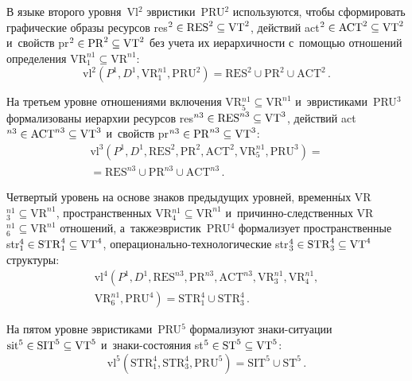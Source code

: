 \begin{multicols}{2}
  В языке второго уровня~Vl$^2$ эвристики~PRU$^2$ используются, чтобы 
сформировать графические образы ресурсов res$^2\hm\in \mathrm{RES}^2\subseteq 
\mathrm{VT}^2$, действий act$^2\hm\in \mathrm{ACT}^2\subseteq \mathrm{VT}^2$ 
и~свойств pr$^2\hm\in 
\mathrm{PR}^2\subseteq \mathrm{VT}^2$ без учета их иерархичности с~помощью отношений 
определения $\mathrm{VR}_1^{n1}\subseteq \mathrm{VR}^{n1}$:
  $$
  \mathrm{vl}^2\!\left( P^1, D^1, \mathrm{VR}_1^{n1}, 
  \mathrm{PRU}^2\right) =\mathrm{RES}^2\cup \mathrm{PR}^2\cup \mathrm{ACT}^2\,.
  $$
  
  На третьем уровне отношениями включения VR$_5^{n1}\subseteq \mathrm{VR}^{n1}$ 
и~эвристиками~PRU$^3$ формализованы иерархии ресурсов res$^{n3}\hm\in 
\mathrm{RES}^{n3}\subseteq \mathrm{VT}^3$, действий act$^{n3}\hm\in \mathrm{ACT}^{n3}
\hm\subseteq \mathrm{VT}^3$ 
и~свойств pr$^{n3}\hm\in \mathrm{PR}^{n3}\subseteq \mathrm{VT}^3$:
  \begin{multline*}
  \mathrm{vl}^3\!\left(P^1, D^1, \mathrm{RES}^2, 
  \mathrm{PR}^2, \mathrm{ACT}^2, \mathrm{VR}_5^{n1}, \mathrm{PRU}^3\right) = {}\\
  {}=
\mathrm{RES}^{n3}\cup \mathrm{PR}^{n3}\cup \mathrm{ACT}^{n3}\,.
\end{multline*}
    
  Четвертый уровень на основе знаков предыду\-щих уровней, 
временн$\acute{\mbox{ы}}$х VR$_3^{n1}\subseteq \mathrm{VR}^{n1}$, 
про\-странственных VR$_4^{n1}\subseteq \mathrm{VR}^{n1}$  
и~при\-чин\-но-след\-ст\-вен\-ных VR$_6^{n1}\subseteq \mathrm{VR}^{n1}$ отношений, 
а~также\linebreak эвристик~PRU$^4$ формализует пространственные str$_1^4\hm\in 
\mathrm{STR}_1^4\subseteq \mathrm{VT}^4$, опе\-ра\-ци\-о\-наль\-но-тех\-но\-ло\-ги\-че\-ские 
str$_3^4\hm\in \mathrm{STR}_3^4\subseteq \mathrm{VT}^4$ структуры:
  \begin{multline*}
  \mathrm{vl}^4\!\left( P^1, D^1, \mathrm{RES}^{n3}, \mathrm{PR}^{n3}, 
  \mathrm{ACT}^{n3}, \mathrm{VR}_3^{n1}, \mathrm{VR}_4^{n1},\right.\\
\left.  \mathrm{VR}_6^{n1}, \mathrm{PRU}^4\right) = \mathrm{STR}_1^4\cup \mathrm{STR}_3^4\,.
\end{multline*}
  
  На пятом уровне эвристиками~PRU$^5$ формализуют зна\-ки-си\-ту\-ации 
$\mathrm{sit}^5\hm\in \mathrm{SIT}^5\subseteq \mathrm{VT}^5$ 
и~зна\-ки-со\-сто\-яния st$^5\hm\in 
\mathrm{ST}^5\subseteq \mathrm{VT}^5$:
    $$
\mathrm{vl}^5\!\left( \mathrm{STR}_1^4, \mathrm{STR}_3^4, \mathrm{PRU}^5\right) =
\mathrm{SIT}^5\cup \mathrm{ST}^5\,.
   $$
  

\end{multicols}
